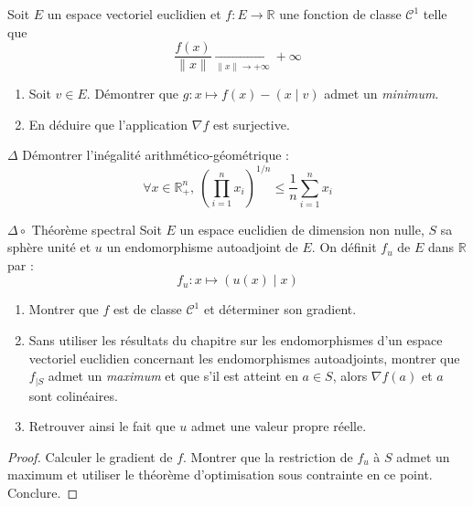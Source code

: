 \documentclass[french,a4paper]{article}
\newcommand{\R}{\mathbb{R}}
\theoremstyle{plain}
\theoremstyle{definition}
\theoremstyle{remark}
\begin{document}
\begin{ex}[Moulin.CD.51]{}
	Soit $E$ un espace vectoriel euclidien et $f:E\to\R$ une fonction de classe $\mathcal{C}^1$ telle que $$\frac{f(x)}{\lVert x\rVert}\xrightarrow[\lVert x\rVert\to+\infty]{}+\infty$$
	\begin{enumerate}
		\item Soit $v\in E$. Démontrer que $g:x\mapsto f(x)-(x\mid v)$ admet un \textit{minimum}.
		\item En déduire que l'application $\nabla f$ est surjective.
	\end{enumerate}
\end{ex}

\begin{ex}[Moulin.CD.51]{$\Delta$}
	Démontrer l'inégalité arithmético-géométrique : $$\forall x\in\R_+^n,\ \left(\prod_{i=1}^{n}x_i\right)^{1/n}\leqslant\frac{1}{n}\sum_{i=1}^{n}x_i$$
\end{ex}

\begin{ex}[Moulin.CD.53]{$\Delta\circ$ Théorème spectral}
	Soit $E$ un espace euclidien de dimension non nulle, $S$ sa sphère unité et $u$ un endomorphisme autoadjoint de $E$. On définit $f_u$ de $E$ dans $\R$ par : $$f_u:x\mapsto (u(x)\mid x)$$
	\begin{enumerate}
		\item Montrer que $f$ est de classe $\mathcal{C}^1$ et déterminer son gradient.
		\item Sans utiliser les résultats du chapitre sur les endomorphismes d'un espace vectoriel euclidien concernant les endomorphismes autoadjoints, montrer que $f_{\mid S}$ admet un \textit{maximum} et que s'il est atteint en $a\in S$, alors $\nabla f(a)$ et $a$ sont colinéaires.
		\item Retrouver ainsi le fait que $u$ admet une valeur propre réelle.
	\end{enumerate}
\end{ex}
\begin{proof}
	Calculer le gradient de $f$. Montrer que la restriction de $f_u$ à $S$ admet un maximum et utiliser le théorème d'optimisation sous contrainte en ce point. Conclure. 
\end{proof}
\end{document}
